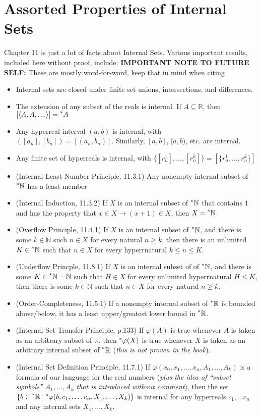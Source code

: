 \documentclass{article}
\newcommand{\sthat}{\,|\,}
\newcommand{\reals}{\mathbb{R}}
\newcommand{\hreals}{\prescript{*}{}{\mathbb{R}}}
\newcommand{\nats}{\mathbb{N}}
\newcommand{\hnats}{\prescript{*}{}{\mathbb{N}}}
\newcommand{\hr}[1]{\prescript{*}{}{#1}}
\begin{document}
\section*{Assorted Properties of Internal Sets}
Chapter 11 is just a lot of facts about Internal Sets. Various important results, included here without proof, include:
\textbf{IMPORTANT NOTE TO FUTURE SELF:} These are mostly word-for-word, keep that in mind when citing
\begin{itemize}
    \item Internal sets are closed under finite set unions, intersections, and differences.
    \item The extension of any subset of the reals is internal. If $A \subseteq \reals$, then $[\langle A, A, \ldots \rangle] = \hr{A}$
    \item Any hyperreal interval $(a, b)$ is internal, with $([a_n], [b_n]) = [(a_n, b_n)]$. Similarly, $[a, b]$, $[a, b)$, etc. are internal.
    \item Any finite set of hyperreals is internal, with $\{[r_n^1], \ldots, [r_n^k]\} = [\{r_n^1, \ldots, r_n^k\}]$
    \item (Internal Least Number Principle, 11.3.1) Any nonempty internal subset of $\hnats$ has a least member
    \item (Internal Induction, 11.3.2) If $X$ is an internal subset of $\hnats$ that contains $1$ and has the property that $x \in X \to (x+1) \in X$, then $X = \hnats$
    \item (Overflow Principle, 11.4.1) If $X$ is an internal subset of $\hnats$, and there is some $k \in \nats$ such $n \in X$ for every natural $n \geq k$, then there is an unlimited $K \in \hnats$ such that $n \in X$ for every hyperrnatural $k \leq n \leq K$.
    \item (Underflow Princple, 11.8.1) If $X$ is an internal subset of of $\hnats$, and there is some $K \in \hnats - \nats$ such that $H \in X$ for every unlimited hyperrnatural $H \leq K$, then there is some $k \in \nats$ such that $n \in X$ for every natural $n \geq k$.
    \item (Order-Completeness, 11.5.1) If a nonempty internal subset of $\hreals$ is bounded above/below, it has a least upper/greatest lower bound in $\hreals$.
    \item (Internal Set Transfer Principle, p.133) If $\varphi(A)$ is true whenever $A$ is taken as an arbitrary subset of $\reals$, then $\hr\varphi(X)$ is true whenever $X$ is taken as an arbitrary internal subset of $\hreals$ (\textit{this is not proven in the book}).
    \item (Internal Set Definition Principle, 11.7.1) If $\varphi(x_0, x_1, \ldots, x_n, A_1, \ldots, A_k)$ is a formula of our language for the real numbers (\textit{plus the idea of ``subset symbols'' $A_1, \ldots, A_k$ that is introduced without comment}), then the set $\{b \in \hreals \sthat \hr\varphi(b, c_1, \ldots, c_n, X_1, \ldots, X_k)\}$ is internal for any hyperreals $c_1, \ldots c_n$ and any internal sets $X_1, \ldots, X_k$.
\end{itemize}
\end{document}
